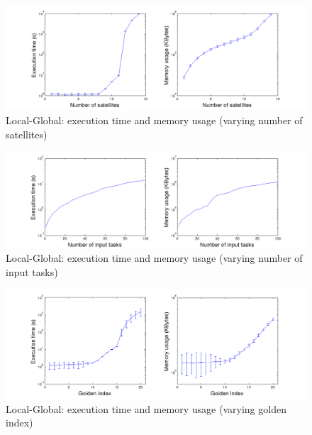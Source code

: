 \begin{figure}[h!]
  \begin{minipage}[b]{\linewidth}
    \includegraphics[width=\linewidth]{Figures/tmLG_slim.png}
    \caption{Local-Global: execution time and memory usage (varying number of satellites)}\label{fig_tmLG_slim}
  \end{minipage}
  \end{figure}
\begin{figure}[h!]
  \begin{minipage}[b]{\linewidth}
    \includegraphics[width=\linewidth]{Figures/tmLG_alim.png}
    \caption{Local-Global: execution time and memory usage (varying number of input tasks)}\label{fig_tmLG_alim}
  \end{minipage}  
\end{figure}
\begin{figure}[h!]
  \begin{minipage}[b]{\linewidth}
    \includegraphics[width=\linewidth]{Figures/tmLG_glim.png}
    \caption{Local-Global: execution time and memory usage (varying golden index)}\label{fig_tmLG_glim}
  \end{minipage}
  \hfill
\end{figure}

